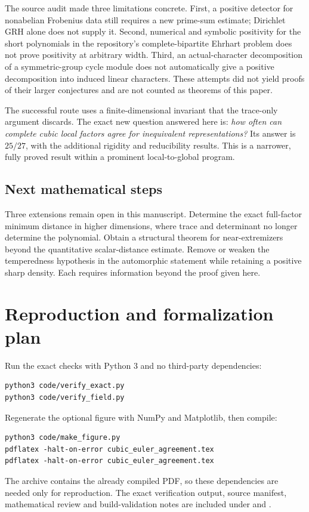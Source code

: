 \documentclass[11pt]{article}
\theoremstyle{definition}\newtheorem{definition}[theorem]{Definition}
\theoremstyle{remark}\newtheorem{remark}[theorem]{Remark}
\newcommand{\pathcode}[1]{\texttt{\detokenize{#1}}}
\begin{document}
The source audit made three limitations concrete. First, a positive detector for nonabelian Frobenius data still requires a new prime-sum estimate; Dirichlet GRH alone does not supply it. Second, numerical and symbolic positivity for the short polynomials in the repository's complete-bipartite Ehrhart problem does not prove positivity at arbitrary width. Third, an actual-character decomposition of a symmetric-group cycle module does not automatically give a positive decomposition into induced linear characters. These attempts did not yield proofs of their larger conjectures and are not counted as theorems of this paper.

The successful route uses a finite-dimensional invariant that the trace-only argument discards. The exact new question answered here is: \emph{how often can complete cubic local factors agree for inequivalent representations?} Its answer is $25/27$, with the additional rigidity and reducibility results. This is a narrower, fully proved result within a prominent local-to-global program.

\subsection{Next mathematical steps}

Three extensions remain open in this manuscript. Determine the exact full-factor minimum distance in higher dimensions, where trace and determinant no longer determine the polynomial. Obtain a structural theorem for near-extremizers beyond the quantitative scalar-distance estimate. Remove or weaken the temperedness hypothesis in the automorphic statement while retaining a positive sharp density. Each requires information beyond the proof given here.

\appendix
\section{Reproduction and formalization plan}

Run the exact checks with Python 3 and no third-party dependencies:
\begin{verbatim}
python3 code/verify_exact.py
python3 code/verify_field.py
\end{verbatim}
Regenerate the optional figure with NumPy and Matplotlib, then compile:
\begin{verbatim}
python3 code/make_figure.py
pdflatex -halt-on-error cubic_euler_agreement.tex
pdflatex -halt-on-error cubic_euler_agreement.tex
\end{verbatim}
The archive contains the already compiled PDF, so these dependencies are needed only for reproduction. The exact verification output, source manifest, mathematical review and build-validation notes are included under \pathcode{results/} and \pathcode{notes/}.
\end{document}

